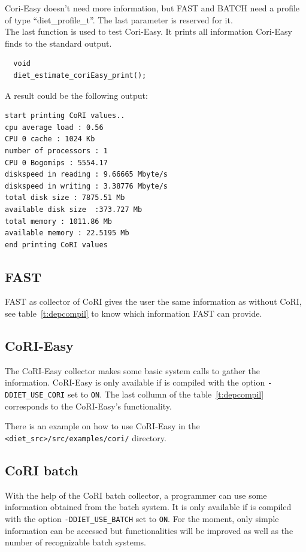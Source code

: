 Cori-Easy doesn't need more information, but FAST and BATCH need a
profile of type ``diet\_profile\_t''. The last parameter is reserved
for it. \\ The last function is used to test Cori-Easy. It prints all
information Cori-Easy finds to the standard output.

\footnotesize
\begin{verbatim}
  void
  diet_estimate_coriEasy_print();
\end{verbatim}
\normalsize
A result could be the following output:
\footnotesize
\begin{verbatim}
start printing CoRI values..
cpu average load : 0.56
CPU 0 cache : 1024 Kb
number of processors : 1
CPU 0 Bogomips : 5554.17
diskspeed in reading : 9.66665 Mbyte/s
diskspeed in writing : 3.38776 Mbyte/s
total disk size : 7875.51 Mb
available disk size  :373.727 Mb
total memory : 1011.86 Mb
available memory : 22.5195 Mb
end printing CoRI values
\end{verbatim}
\normalsize

\subsection{FAST}
FAST as collector of CoRI gives the user the same information as
without CoRI, see table~\ref{t:depcompil} to know which information FAST can
provide.

\subsection{CoRI-Easy}
The CoRI-Easy collector makes some basic system calls to gather the
information. CoRI-Easy is only available if \diet is compiled with the
option \texttt{-DDIET\_USE\_CORI} set to \texttt{ON}. The last collumn
of the table~\ref{t:depcompil} corresponds to the CoRI-Easy's
functionality.

There is an example on how to use CoRI-Easy in the
\verb!<diet_src>/src/examples/cori/! directory.

\subsection{CoRI batch}\label{section:cori_batch}
With the help of the CoRI batch collector, a \sed programmer can use
some information obtained from the batch system. It is only available
if \diet is compiled with the option \texttt{-DDIET\_USE\_BATCH} set
to \texttt{ON}. For the moment, only simple information can be
accessed but functionalities will be improved as well as the number of
recognizable batch systems.

